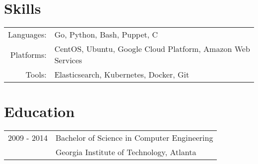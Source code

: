 \documentclass[letterpaper]{article}
\begin{document}

\section*{Skills}
\begin{tabular}{rl}
    Languages: & Go, Python, Bash, Puppet, C\\
    Platforms: & CentOS, Ubuntu, Google Cloud Platform, Amazon Web Services\\
    Tools: & Elasticsearch, Kubernetes, Docker, Git\\
\end{tabular}

\section*{Education}
\begin{tabular}{rl}
    2009 - 2014 & Bachelor of Science in {Computer Engineering}\\
    & {Georgia Institute of Technology}, Atlanta\\
\end{tabular}
\end{document}
